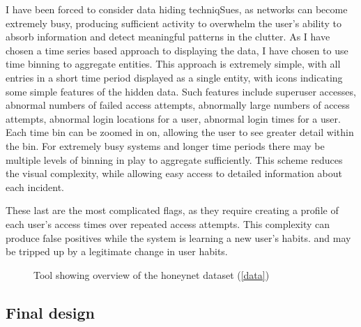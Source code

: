 I have been forced to consider data hiding techniqSues, as networks can become extremely busy, producing sufficient activity to overwhelm the user's ability to absorb information and detect meaningful patterns in the clutter. As I have chosen a time series based approach to displaying the data, I have chosen to use time binning to aggregate entities. This approach is extremely simple, with all entries in a short time period displayed as a single entity, with icons indicating some simple features of the hidden data. Such features include superuser accesses, abnormal numbers of failed access attempts, abnormally large numbers of access attempts, abnormal login locations for a user, abnormal login times for a user. Each time bin can be zoomed in on, allowing the user to see greater detail within the bin. For extremely busy systems and longer time periods there may be multiple levels of binning in play to aggregate sufficiently. This scheme reduces the visual complexity, while allowing easy access to detailed information about each incident. 

These last are the most complicated flags, as they require creating a profile of each user's access times over repeated access attempts. This complexity can produce false positives while the system is learning a new user's habits. and may be tripped up by a legitimate change in user habits.

\begin{figure}[tbh!]
\caption{\protect\label{overview}Tool showing overview of the honeynet dataset (\ref{data})}
\end{figure}

\subsection {Final design}

